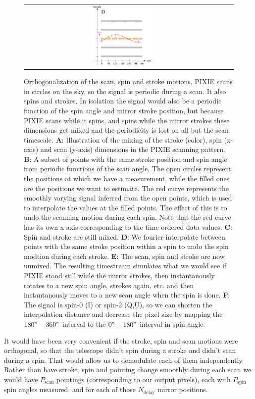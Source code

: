 \documentclass{article}
\begin{document}
\begin{figure}
\begin{tabular}{ccc}
		\includegraphics[width=0.32\textwidth]{plots/shift4.pdf}
	\end{tabular}
	\caption{Orthogonalization of the scan, spin and stroke
	motions. PIXIE scans in circles on the sky, so the
	signal is periodic during a scan. It also spins and strokes.
	In isolation the signal would also be a periodic function
	of the spin angle and mirror stroke position, but because
	PIXIE scans while it spins, and spins
	while the mirror strokes these dimensions get mixed and the
	periodicity is lost on all but the scan timescale.
	\textbf{A}: Illustration of the mixing of the stroke (color),
	spin (x-axis) and scan (y-axis) dimensions in the PIXIE scanning
	pattern. \textbf{B}: A subset of points with the same stroke
	position and spin angle from periodic functions of the scan
	angle. The open circles represent the positions at which
	we have a measurement, while the filled ones are the positions
	we want to estimate. The red curve represents the smoothly
	varying signal inferred from the open points, which is used to
	interpolate the values at the filled points. The effect of
	this is to undo the scanning motion during each spin.
	Note that the red curve has its own x axis corresponding
	to the time-ordered data values.
	\textbf{C}: Spin and stroke are still
	mixed. \textbf{D}: We fourier-interpolate between points with
	the same stroke position within a spin to undo the spin
	modtion during each stroke. \textbf{E}: The scan, spin and stroke
	are now unmixed. The resulting timestream simulates what we would
	see if PIXIE stood still while the mirror strokes, then
	instantanously rotates to a new spin angle, strokes again, etc.
	and then instantanously moves to a new scan angle when the spin is done.
	\textbf{F}: The signal is spin-0 (I) or spin-2 (Q,U), so we can
	shorten the interpolation distance and decrease the pixel size
	by mapping the $180\degree-360\degree$ interval to the $0\degree-
	180\degree$ interval in spin angle.}
	\label{fig:ortho}
\end{figure}
It would have been very convenient if the stroke, spin and scan motions were
orthogonal, so that the telescope didn't spin during a stroke and didn't scan
during a spin. That would allow us to demodulate each of them independently.
Rather than have stroke, spin and pointing change smoothly during each scan
we would have $P_\textrm{scan}$ pointings (corresponding
to our output pixels), each with
$P_\textrm{spin}$ spin angles measured, and for each
of those $N_\textrm{delay}$ mirror positions.
\end{document}
